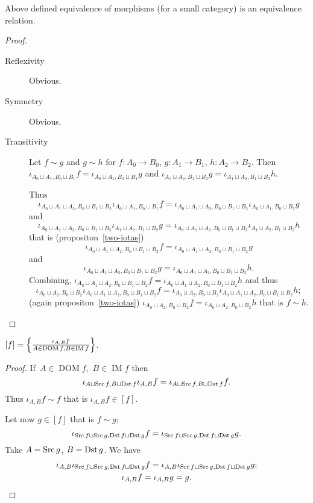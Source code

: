 \begin{prop}
Above defined equivalence of morphisms (for a small category)
is an equivalence relation.
\end{prop}

\begin{proof}
~
\begin{description}
\item[Reflexivity] Obvious.

\item[Symmetry] Obvious.

\item[Transitivity] Let $f\sim g$ and $g\sim h$ for
$f:A_0\to B_0$, $g:A_1\to B_1$, $h:A_2\to B_2$.
Then
$\iota_{A_0\sqcup A_1,B_0\sqcup B_1}f=\iota_{A_0\sqcup A_1,B_0\sqcup B_1}g$ and
$\iota_{A_1\sqcup A_2,B_1\sqcup B_2}g=\iota_{A_1\sqcup A_2,B_1\sqcup B_2}h$.

Thus
\[\iota_{A_0\sqcup A_1\sqcup A_2,B_0\sqcup B_1\sqcup B_2}\iota_{A_0\sqcup A_1,B_0\sqcup B_1}f=\iota_{A_0\sqcup A_1\sqcup A_2,B_0\sqcup B_1\sqcup B_2}\iota_{A_0\sqcup A_1,B_0\sqcup B_1}g\] and
\[\iota_{A_0\sqcup A_1\sqcup A_2,B_0\sqcup B_1\sqcup B_2}\iota_{A_1\sqcup A_2,B_1\sqcup B_2}g=\iota_{A_0\sqcup A_1\sqcup A_2,B_0\sqcup B_1\sqcup B_2}\iota_{A_1\sqcup A_2,B_1\sqcup B_2}h\]
that is (propositon~\ref{two-iotas})
\[\iota_{A_0\sqcup A_1\sqcup A_2,B_0\sqcup B_1\sqcup B_2}f=\iota_{A_0\sqcup A_1\sqcup A_2,B_0\sqcup B_1\sqcup B_2}g\]
and
\[\iota_{A_0\sqcup A_1\sqcup A_2,B_0\sqcup B_1\sqcup B_2}g=\iota_{A_0\sqcup A_1\sqcup A_2,B_0\sqcup B_1\sqcup B_2}h.\]
Combining,
$\iota_{A_0\sqcup A_1\sqcup A_2,B_0\sqcup B_1\sqcup B_2}f=\iota_{A_0\sqcup A_1\sqcup A_2,B_0\sqcup B_1\sqcup B_2}h$ and thus
\[\iota_{A_0\sqcup A_2,B_0\sqcup B_2}\iota_{A_0\sqcup A_1\sqcup A_2,B_0\sqcup B_1\sqcup B_2}f=\iota_{A_0\sqcup A_2,B_0\sqcup B_2}\iota_{A_0\sqcup A_1\sqcup A_2,B_0\sqcup B_1\sqcup B_2}h;\]
(again propositon~\ref{two-iotas}) $\iota_{A_0\sqcup A_2,B_0\sqcup B_2}f=\iota_{A_0\sqcup A_2,B_0\sqcup B_2}h$
that is $f\sim h$.
\end{description}
\end{proof}

\begin{prop}
$[f] = \left\{ \frac{\iota_{A,B}f}{
A\in\operatorname{DOM}f,B\in\operatorname{IM}f}\right\}$.
\end{prop}

\begin{proof}
If~$A\in\operatorname{DOM}f$,~$B\in\operatorname{IM}f$
then
\[\iota_{A\sqcup\operatorname{Src} f,B\sqcup\operatorname{Dst} f}\iota_{A,B}f =
\iota_{A\sqcup\operatorname{Src} f,B\sqcup\operatorname{Dst} f}f.\] Thus
$\iota_{A,B}f\sim f$ that is $\iota_{A,B}f\in[f]$.

Let now $g\in[f]$ that is $f\sim g$;
\[\iota_{\operatorname{Src} f\sqcup\operatorname{Src} g,\operatorname{Dst} f\sqcup\operatorname{Dst} g}f=
\iota_{\operatorname{Src} f\sqcup\operatorname{Src} g,\operatorname{Dst} f\sqcup\operatorname{Dst} g}g.\]
Take $A=\operatorname{Src} g$, $B=\operatorname{Dst} g$. We have
\begin{gather*}
\iota_{A,B}\iota_{\operatorname{Src} f\sqcup\operatorname{Src} g,\operatorname{Dst} f\sqcup\operatorname{Dst} g}f=
\iota_{A,B}\iota_{\operatorname{Src} f\sqcup\operatorname{Src} g,\operatorname{Dst} f\sqcup\operatorname{Dst} g}g;\\
\iota_{A,B}f=\iota_{A,B}g = g.
\end{gather*}
\end{proof}

